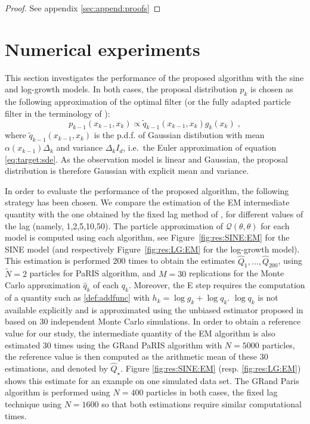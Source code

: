 \documentclass[12pt]{article}
\newcommand{\eqsp}{\;}
\newcommand{\1}{\mathrm{1}}
\newcommand{\hQ}{\widehat{Q}}
\begin{document}
\begin{proof}
See appendix \ref{sec:append:proofs}
\end{proof}


\section{Numerical experiments}
\label{sec:exp}
This section investigates the performance of the proposed algorithm with the sine and log-growth models. 
In both cases, the proposal distribution $p_k$ is chosen as the following approximation of the optimal filter (or the fully adapted particle filter in the terminology of \cite{pitt:shephard:1999}): 
$$p_{k-1}(x_{k-1},x_k)\propto \tilde{q}_{k-1}(x_{k-1}, x_k)g_k(x_{k})\eqsp,$$
where $\tilde{q}_{k-1}(x_{k-1},x_k)$ is the p.d.f. of Gaussian distibution with mean $\alpha(x_{k-1})\Delta_k$ and variance $\Delta_kI_d$, i.e.\ the Euler approximation of equation \eqref{eq:target:sde}. As the observation model is linear and Gaussian, the proposal distribution is therefore Gaussian with explicit mean and variance.


In order to evaluate the performance of the proposed algorithm, the following strategy has been chosen. 
We compare the estimation of the EM intermediate quantity with the one obtained by the fixed lag method of \cite{olsson:strojby:2011}, for different values of the lag (namely, 1,2,5,10,50). 
The particle approximation of $\mathcal{Q}(\theta,\theta)$ for each model  is computed using each algorithm, see Figure~\ref{fig:res:SINE:EM} for the SINE model (and respectively Figure~\ref{fig:res:LG:EM} for the log-growth model). 
This estimation is performed 200 times to obtain the estimates $\hQ_1,\dots,\hQ_{200}$, using $\tilde{N}=2$ particles for PaRIS algorithm, and $M=30$ replications for the Monte Carlo approximation $\widehat q_k$ of each $q_k$.  
Moreover, the E step requires the computation of a quantity such as \eqref{def:addfunc} with $h_k= \log g_k + \log q_k$.  $\log q_k$ is not available explicitly and is approximated using the unbiased estimator proposed in \cite[Appendix B]{olsson:strojby:2011} based on 30 independent Monte Carlo simulations.
In order to obtain a reference value for our study, the intermediate quantity of the EM algorithm is also estimated 30 times using the GRand PaRIS algorithm with $N=5000$ particles, the reference value is then computed as the arithmetic mean of these 30 estimations, and denoted by $\hQ_\star$. 
Figure \ref{fig:res:SINE:EM} (resp. \ref{fig:res:LG:EM}) shows this estimate for an example on one simulated data set. 
The GRand Paris algorithm is performed using $N=400$ particles in both cases, the fixed lag technique using $N=1600$ so that both estimations require similar computational times.
\end{document}
